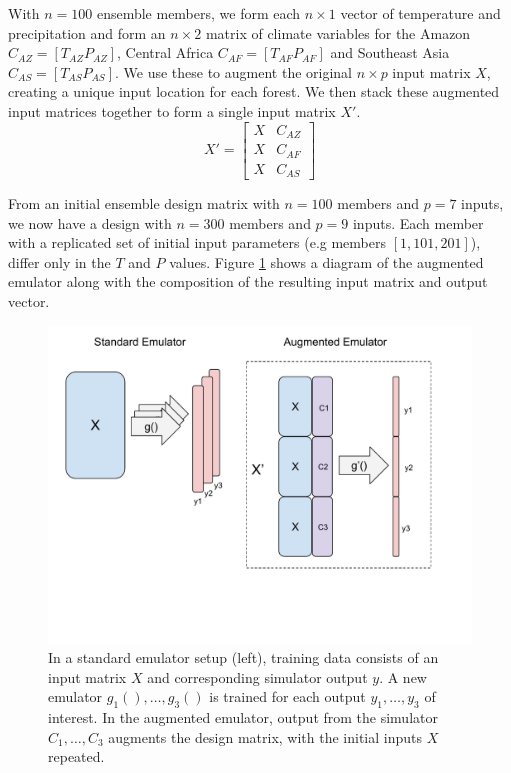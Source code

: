 \documentclass[gmd, manuscript]{copernicus}
\begin{document}
With $n = 100$ ensemble members, we form each  $n \times 1$ vector of temperature and precipitation and form an $n \times 2$ matrix of climate variables for the Amazon $C_{AZ} = [T_{AZ} P_{AZ}]$, Central Africa $C_{AF}=[T_{AF} P_{AF}]$ and Southeast Asia $C_{AS} = [T_{AS} P_{AS}]$. We use these to augment the original $n \times p$ input matrix $X$, creating a unique input location for each forest. We then stack these augmented input matrices together to form a single input matrix $X'$.
\begin{equation}
X' = \begin{bmatrix}
X & C_{AZ} \\
X & C_{AF}  \\
X & C_{AS}
\end{bmatrix}
\end{equation}

From an initial ensemble design matrix with $n=100$ members and $p=7$ inputs, we now have a design with $n=300$ members and $p=9$ inputs. Each member with a replicated set of initial input parameters (e.g members $[1, 101, 201]$), differ only in the $T$ and $P$ values. Figure \ref{fig:augmented_emulator} shows a diagram of the augmented emulator along with the composition of the resulting input matrix and output vector.

\begin{figure}[t]
\includegraphics[width=12cm]{../graphics/augmented_emulator.pdf}
\caption{In a standard emulator setup (left), training data consists of an input matrix $X$ and corresponding simulator output $y$. A new emulator $g_{1}(), \ldots,g_{3}()$ is trained for each output $y_{1}, \ldots, y_{3}$ of interest. In the augmented emulator, output from the simulator $C_{1}, \ldots, C_{3}$ augments the design matrix, with the initial inputs $X$ repeated.}
\label{fig:augmented_emulator}
\end{figure}
\end{document}
